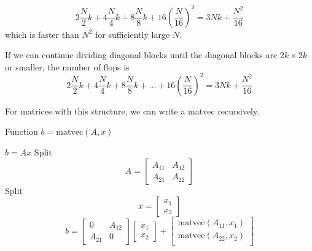 \begin{equation*}
    2 \frac{N}{2} k +
    4 \frac{N}{4} k +
    8 \frac{N}{8} k +
    16 \left(\frac{N}{16} \right)^2 =
    3Nk+\frac{N^2}{16}
\end{equation*}
which is faster than $N^2$ for sufficiently large $N$.

If we can continue dividing diagonal blocks until the diagonal blocks are $2k\times 2k$ or smaller, the number of flops is
\begin{equation*}
    2 \frac{N}{2} k +
    4 \frac{N}{4} k +
    8 \frac{N}{8} k + \ldots +
    16 \left(\frac{N}{16} \right)^2 =
    3Nk+\frac{N^2}{16}
\end{equation*}


For matrices with this structure, we can write a matvec recursively.
\begin{algorithm}
    \caption{Function $b=\text{matvec}(A, x)$}
    \begin{algorithmic}
            \STATE $b = Ax$
        \ELSE
            \STATE Split \begin{equation*}
                A = \begin{bmatrix}
                    A_{11} & A_{12}\\
                    A_{21} & A_{22}
            \end{bmatrix}
        \end{equation*}
            \STATE Split \begin{equation*}
            x = \begin{bmatrix}
                x_1 \\
                x_2
            \end{bmatrix}
        \end{equation*}
        \STATE
        \begin{equation*}
            b =
            \begin{bmatrix}
                0 & A_{12} \\
                A_{21} & 0
            \end{bmatrix}
            \begin{bmatrix}
                x_1 \\
                x_2
            \end{bmatrix}
            +
            \begin{bmatrix}
                \text{matvec}(A_{11},x_1) \\
                \text{matvec}(A_{22},x_2) \\
            \end{bmatrix}
        \end{equation*}
        \ENDIF
    \end{algorithmic}
\end{algorithm}

